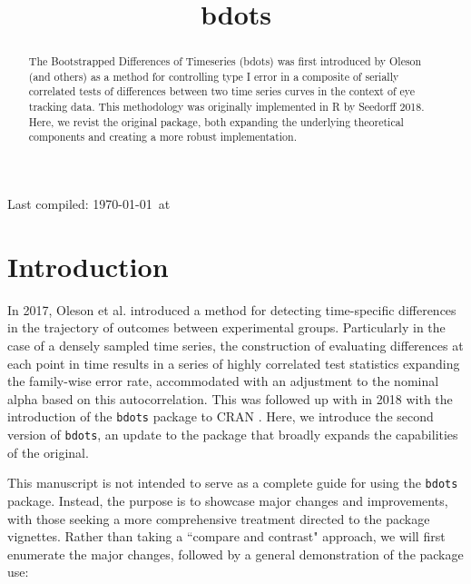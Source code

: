 \documentclass{article}
\title{bdots}
\date{}
\newcommand{\xt}{\texttt}%
\begin{document}

\maketitle

Last compiled: \today \  at \currenttime

%

\begin{abstract}
The Bootstrapped Differences of Timeseries (bdots) was first introduced by Oleson (and others) as a method for controlling type I error in a composite of serially correlated tests of differences between two time series curves in the context of eye tracking data.  This methodology was originally implemented in R by Seedorff 2018. Here, we revist the original package, both expanding the underlying theoretical components and creating a more robust implementation.
\end{abstract}


\section{Introduction}



In 2017, Oleson et al. introduced a method for detecting time-specific differences in the trajectory of outcomes between experimental groups. Particularly in the case of a densely sampled time series, the construction of evaluating differences at each point in time results in a series of highly correlated test statistics expanding the family-wise error rate, accommodated with an adjustment to the nominal alpha based on this autocorrelation. This was followed up with in 2018 with the introduction of the \xt{bdots} package to CRAN \cite{seedorff2018bdots}. Here, we introduce the second version of \texttt{bdots}, an update to the package that broadly expands the capabilities of the original. 

This manuscript is not intended to serve as a complete guide for using the \xt{bdots} package. Instead, the purpose is to showcase major changes and improvements, with those seeking a more comprehensive treatment directed to the package vignettes. Rather than taking a ``compare and contrast" approach, we will first enumerate the major changes, followed by a general demonstration of the package use:
\end{document}
